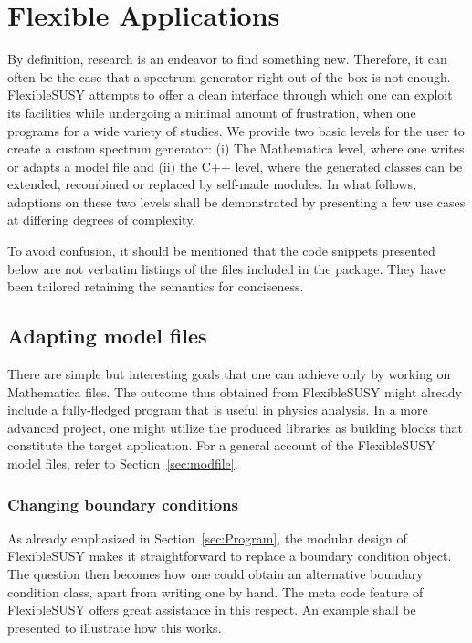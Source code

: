 \documentclass[final,3p,11pt,pdflatex]{elsarticle}
\makeatletter
\newcommand{\fs}{FlexibleSUSY\@\xspace}
\newcommand{\mathematica}{Mathematica\xspace}
\newcommand{\secref}[1]{Section~\ref{#1}}
\makeatother
\begin{document}
\section{Flexible Applications}
\label{sec:Flexible}

By definition, research is an endeavor to find something new.
Therefore, it can often be the case that
a spectrum generator right out of the box is not enough.
\fs attempts to offer a clean interface through which
one can exploit its facilities
while undergoing a minimal amount of frustration,
when one programs for a wide variety of studies.
We provide two basic levels for the user to create a custom spectrum
generator: (i) The \mathematica level, where one writes or
adapts a model file and (ii) the C++ level, where the generated
classes can be extended, recombined or replaced by self-made modules.
In what follows, adaptions on these two levels shall be demonstrated
by presenting a few use cases at differing degrees of complexity.

To avoid confusion,
it should be mentioned that
the code snippets presented below are not
verbatim listings of the files included in the package.
They have been tailored retaining the semantics
for conciseness.

\subsection{Adapting model files}
\label{sec:adapting-model-files}

There are simple but interesting goals
that one can achieve only by working on
\mathematica files.
The outcome thus obtained from \fs
might already include a fully-fledged program
that is useful in physics analysis.
In a more advanced project,
one might utilize the produced libraries as building blocks
that constitute the target application.
For a general account of the \fs model files,
refer to \secref{sec:modfile}.

\subsubsection{Changing boundary conditions}
\label{sec:changing boundary conditions}

As already emphasized in \secref{sec:Program}, the modular design of
\fs makes it straightforward %
to replace a boundary condition object.
The question then becomes how
one could obtain an alternative boundary condition class,
apart from writing one by hand.
The meta code feature of \fs offers great assistance
in this respect.
An example shall be presented to illustrate how this works.
\end{document}
